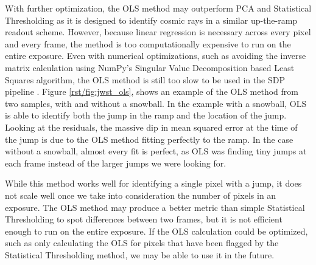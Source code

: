 With further optimization, the OLS method may outperform PCA and Statistical Thresholding as it is designed to identify cosmic rays in a similar up-the-ramp readout scheme.
However, because linear regression is necessary across every pixel and every frame, the method is too computationally expensive to run on the entire exposure.
Even with numerical optimizations, such as avoiding the inverse matrix calculation using NumPy's Singular Value Decomposition based Least Squares algorithm, the OLS method is still too slow to be used in the SDP pipeline \cite{harris2020array}.
Figure \ref{rst/fig:jwst_ols}, shows an example of the OLS method from two samples, with and without a snowball.
In the example with a snowball, OLS is able to identify both the jump in the ramp and the location of the jump.
Looking at the residuals, the massive dip in mean squared error at the time of the jump is due to the OLS method fitting perfectly to the ramp.
In the case without a snowball, almost every fit is perfect, as OLS was finding tiny jumps at each frame instead of the larger jumps we were looking for.

While this method works well for identifying a single pixel with a jump, it does not scale well once we take into consideration the number of pixels in an exposure.
The OLS method may produce a better metric than simple Statistical Thresholding to spot differences between two frames, but it is not efficient enough to run on the entire exposure.
If the OLS calculation could be optimized, such as only calculating the OLS for pixels that have been flagged by the Statistical Thresholding method, we may be able to use it in the future.

